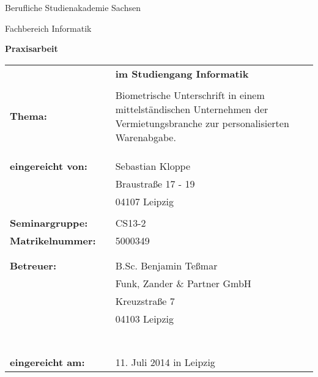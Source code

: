 \thispagestyle{empty}
\begin{center}
\Large{Berufliche Studienakademie Sachsen}
\end{center}
 
\begin{center}
\Large{Fachbereich Informatik}
\end{center}
\hspace{4cm}

\begin{center}
\textbf{\LARGE{Praxisarbeit}}
\end{center}
\hspace{4cm}

\begin{flushleft}
\begin{tabular}{l p{10pt} p{290pt}}
& & \textbf{im Studiengang Informatik}\\
\\
\textbf{Thema:} & &  Biometrische Unterschrift in einem mittelständischen Unternehmen 
der Vermietungsbranche zur personalisierten Warenabgabe.\\
& & \\
& & \\
& & \\
\textbf{eingereicht von:} & & Sebastian Kloppe \\
& &                           Braustraße 17 - 19\\
& &                           04107 Leipzig\\
& & \\
\textbf{Seminargruppe:} & & CS13-2 \\
\textbf{Matrikelnummer:} & & 5000349\\
& & \\
& & \\
\textbf{Betreuer:} & & B.Sc. Benjamin Teßmar\\
& &                    Funk, Zander \& Partner GmbH\\
& &                    Kreuzstraße 7\\
& &                    04103 Leipzig\\
& & \\
& & \\
& & \\
& & \\
& & \\
& & \\
& & \\
\textbf{eingereicht am:} & & 11. Juli 2014 in Leipzig\\
\end{tabular}
\end{flushleft}